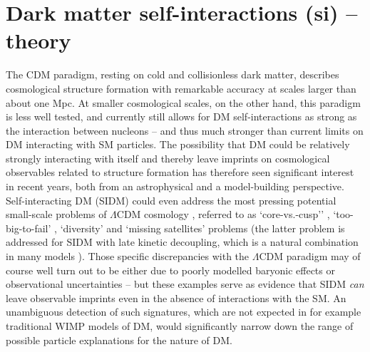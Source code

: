 \section{Dark matter self-interactions (si) -- theory}
\label{sec:si}

The CDM paradigm, resting on cold and collisionless dark matter, describes cosmological structure 
formation with remarkable accuracy at scales larger than about one Mpc. At smaller cosmological scales, 
on the other hand, this  paradigm is less well tested, and currently still allows for DM self-interactions  
as strong as the interaction between nucleons --  and thus much stronger than current limits on
DM interacting with SM particles. The possibility that DM could be relatively strongly interacting with itself \cite{Spergel:1999mh}
and thereby leave imprints on cosmological observables related to structure formation
has therefore seen significant interest in recent years, both from an astrophysical and a model-building
perspective. Self-interacting DM (SIDM) could even address \cite{Loeb:2010gj,Vogelsberger:2012ku,Peter:2012jh,
Zavala:2012us,Aarssen:2012fx,Elbert:2014bma,Kamada:2016euw,Robertson:2017mgj} the most pressing 
potential small-scale problems of $\Lambda$CDM cosmology 
\cite{Bullock:2017xww}, referred to as `core-vs.-cusp'' \cite{Flores:1994gz,Moore:1994yx}, `too-big-to-fail'
\cite{BoylanKolchin:2011de,BoylanKolchin:2011dk}, `diversity'  \cite{Oman:2015xda,Oman:2016zjn}
and `missing satellites' problems \cite{Moore:1999nt,Klypin:1999uc} (the latter problem is addressed for 
SIDM with late kinetic decoupling, which is a natural combination in many models \cite{Bringmann:2016ilk}).
Those specific discrepancies with the $\Lambda$CDM paradigm may of course well turn out to be either
due to  poorly modelled baryonic effects or observational uncertainties -- but these examples serve as 
evidence that SIDM {\it can} leave observable imprints even in the absence of interactions with the SM.
An unambiguous detection of such signatures, which are not expected in for example traditional
WIMP models of DM, would significantly narrow down the range of possible particle explanations
for the nature of DM.

